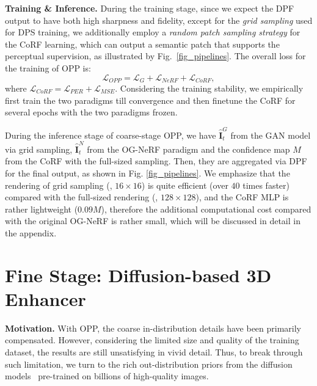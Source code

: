 % 

\vspace{0.1cm}
\noindent\textbf{Training \& Inference.} During the training stage, since we expect the DPF output to have both high sharpness and fidelity, except for the \textit{grid sampling} used for DPS training, we additionally employ a \textit{random patch sampling strategy} for the CoRF learning, which can output a semantic patch that supports the perceptual supervision, as illustrated by Fig.~\ref{fig_pipelines}. The overall loss for the training of OPP is:
\begin{equation}
    \mathcal{L}_{OPP} = \mathcal{L}_{G} + \mathcal{L}_{NeRF} + \mathcal{L}_{CoRF} ,
\end{equation}
where $\mathcal{L}_{CoRF} = \mathcal{L}_{PER} + \mathcal{L}_{MSE}$. Considering the training stability, we empirically first train the two paradigms till convergence and then finetune the CoRF for several epochs with the two paradigms frozen. 

During the inference stage of coarse-stage OPP, we have $\hat{\textbf{I}}_t^{G}$ from the GAN model via grid sampling, $\hat{\textbf{I}}_t^{N}$ from the OG-NeRF paradigm and the confidence map $M$ from the CoRF with the full-sized sampling. Then, they are aggregated via DPF for the final output, as shown in Fig. \ref{fig_pipelines}. We emphasize that the rendering of grid sampling (\eg, $16\times16$) is quite efficient (over $40$ times faster) compared with the full-sized rendering (\eg, $128\times128$), and the CoRF MLP is rather lightweight ($0.09M$), therefore the additional computational cost compared with the original OG-NeRF is rather small, which will be discussed in detail in the appendix. 

\section{\textbf{Fine Stage: Diffusion-based 3D Enhancer}}
\label{fine_stage_Diff3DE}


\noindent\textbf{Motivation.} With OPP, the coarse in-distribution details have been primarily compensated. However, considering the limited size and quality of the training dataset, the results are still unsatisfying in vivid detail. Thus, to break through such limitation, we turn to the rich out-distribution priors from the diffusion models~\cite{rombach2022LatentDiff,zhang2023addingControlNet} pre-trained on billions of high-quality images. 

